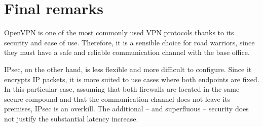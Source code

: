 \documentclass{homework}
\begin{document}
    
    \section{Final remarks}
    OpenVPN is one of the most commonly used VPN protocols thanks to its security and ease of use.
    Therefore, it is a sensible choice for road warriors, since they must have a safe and reliable communication channel with the base office.
    
    IPsec, on the other hand, is less flexible and more difficult to configure.
    Since it encrypts IP packets, it is more suited to use cases where both endpoints are fixed.
    In this particular case, assuming that both firewalls are located in the same secure compound and that the communication channel does not leave its premises, IPsec is an overkill.
    The additional -- and superfluous -- security does not justify the substantial latency increase.
\end{document}
